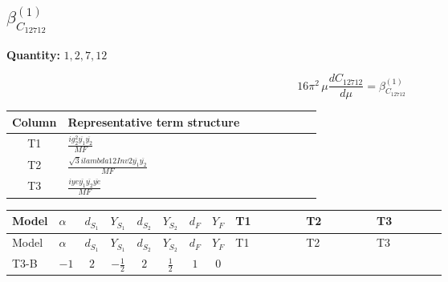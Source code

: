 \documentclass[8pt]{article}
\begin{document}
\begin{landscape}
\section*{$\beta_{C_{12712}}^{(1)}$}
\noindent\textbf{Quantity: }$\mathrm{1,2,7,12}$\par\smallskip
\[16\pi^2\,\mu\frac{d C_{12712}}{d\mu}=\beta_{C_{12712}}^{(1)}\]
\begin{center}
\begin{tabular}{@{}c >{\raggedright\arraybackslash}p{0.82\linewidth}@{}}
\toprule
Column & Representative term structure \\
\midrule
T1 & \(\displaystyle \frac{i g_{2}^{2} \overline{y_{1}} \overline{y_{2}}}{MF}\) \\
\midrule
T2 & \(\displaystyle \frac{\sqrt{3} i lambda12Inv2 \overline{y_{1}} \overline{y_{2}}}{MF}\) \\
\midrule
T3 & \(\displaystyle \frac{i ye \overline{y_{1}} \overline{y_{2}} \overline{ye}}{MF}\) \\
\midrule
\bottomrule
\end{tabular}
\end{center}
\smallskip
\tiny
\begin{longtable}{@{}llcccccc >{\raggedright\arraybackslash}p{0.21\linewidth} >{\raggedright\arraybackslash}p{0.21\linewidth} >{\raggedright\arraybackslash}p{0.21\linewidth}@{}}
\toprule
Model & $\alpha$ & $d_{S_1}$ & $Y_{S_1}$ & $d_{S_2}$ & $Y_{S_2}$ & $d_F$ & $Y_F$ & T1 & T2 & T3 \\
\midrule
\endfirsthead
\toprule
Model & $\alpha$ & $d_{S_1}$ & $Y_{S_1}$ & $d_{S_2}$ & $Y_{S_2}$ & $d_F$ & $Y_F$ & T1 & T2 & T3 \\
\midrule
\endhead
T3-B & $-1$ & $2$ & $-\frac{1}{2}$ & $2$ & $\frac{1}{2}$ & $1$ & $0$ & \scriptsize\adjustbox{max width=\linewidth}{$\begin{gathered} - \frac{3 i g_{2}^{2} \overline{y_{1}} \overline{y_{2}}}{8 MF}\end{gathered}$} & \scriptsize\adjustbox{max width=\linewidth}{$\begin{gathered} - \frac{\sqrt{3} i lambda12Inv2 \overline{y_{1}} \overline{y_{2}}}{6 MF}\end{gathered}$} & \scriptsize\adjustbox{max width=\linewidth}{$\begin{gathered} \frac{i ye \overline{y_{1}} \overline{y_{2}} \overline{ye}}{8 MF}\end{gathered}$} \\
\midrule
\bottomrule
\end{longtable}
\clearpage

\end{landscape}
\end{document}
